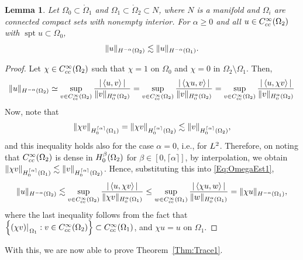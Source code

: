 \documentclass[a4paper,10pt,reqno]{amsart}
\newcommand{\rest}[1]{{{\lvert_{}}_{}}_{#1}}
\newcommand{\dbrac}[1]{\left\{#1\right\}}
\newcommand{\interior}[1]{\mathring{#1}}
\newcommand{\modulus}[1]{|#1|}
\newcommand{\norm}[1]{\| #1 \|}%
\newcommand{\set}[1]{\dbrac{#1}}
\newcommand{\Lp}[2][{}]{{\rm L}^{#2}_{\rm #1}}%
\newcommand{\Ck}[2][{}]{{\rm C}^{#2}_{\rm #1}}%
\newcommand{\Hard}[2][{}]{{\rm H}^{#2}_{\rm #1}}%
\newcommand{\SobH}[2][{}]{\Hard[#1]{\rm #2}}
\newcommand{\ceil}[1]{\lceil #1 \rceil}%
\DeclareMathOperator{\spt}{spt}%
\newcommand{\inprod}[1]{\left\langle #1 \right\rangle}%
\newtheorem{lemma}[theorem]{Lemma}
\theoremstyle{definition}
\begin{document}
\begin{lemma}
\label{Lem:OmegaEst}
Let $\Omega_0 \subset \interior{\Omega}_1$ and  $\Omega_1 \subset \interior{\Omega}_2 \subset N$, where $N$ is a manifold and $\Omega_i$ are connected compact sets with nonempty interior.
For $\alpha \geq 0$ and all $u \in \Ck[cc]{\infty}(\Omega_2)$ with $\spt u \subset \Omega_0$,
$$ \norm{u}_{\SobH{-\alpha}(\Omega_2)} \lesssim \norm{u}_{\SobH{-\alpha}(\Omega_1)}.$$
\end{lemma}
\begin{proof}
Let $\chi \in \Ck[cc]{\infty}(\Omega_2)$ such that $\chi = 1$ on $\Omega_0$ and $\chi = 0$ in $\Omega_2 \setminus \Omega_1$.
Then,
\begin{align}
\label{Eq:OmegaEst1}
\norm{u}_{\SobH{-\alpha}(\Omega_2)}
\simeq
\sup_{v \in \Ck[cc]{\infty}(\Omega_2)} \frac{\modulus{\inprod{u, v}}}{\norm{v}_{\SobH[0]{\alpha}(\Omega_2)}}
=
\sup_{v \in \Ck[cc]{\infty}(\Omega_2)} \frac{\modulus{\inprod{\chi u, v}}}{\norm{v}_{\SobH[0]{\alpha}(\Omega_2)}}
=
\sup_{v \in \Ck[cc]{\infty}(\Omega_2)} \frac{\modulus{\inprod{ u, \chi v}}}{\norm{v}_{\SobH[0]{\alpha}(\Omega_2)}}
\end{align}
Now, note that
$$ \norm{\chi v}_{\SobH[0]{\ceil{\alpha}}(\Omega_1)}
=
\norm{\chi v}_{\SobH[0]{\ceil{\alpha}}(\Omega_2)}
\lesssim
\norm{v}_{\SobH[0]{\ceil{\alpha}}(\Omega_2)},
$$
and this inequality holds also for the case $\alpha = 0$, i.e., for $\Lp{2}$.
Therefore, on noting that $\Ck[cc]{\infty}(\Omega_2)$ is dense in $\SobH[0]{\beta}(\Omega_2)$ for $\beta \in [0,\ceil{\alpha}]$, by interpolation, we obtain $\norm{\chi v}_{\SobH[0]{\ceil{\alpha}}(\Omega_1)} \lesssim \norm{v}_{\SobH[0]{\ceil{\alpha}}(\Omega_2)}$.
Hence, substituting this into \eqref{Eq:OmegaEst1},
$$
\norm{u}_{\SobH{-\alpha}(\Omega_2)}
\lesssim
\sup_{v \in \Ck[cc]{\infty}(\Omega_2)} \frac{\modulus{\inprod{ u, \chi v}}}{\norm{\chi v}_{\SobH[0]{\alpha}(\Omega_1)}}
\leq
\sup_{w \in \Ck[cc]{\infty}(\Omega_1)} \frac{\modulus{\inprod{ \chi u, w}}}{\norm{w}_{\SobH[0]{\alpha}(\Omega_1)}}
= \norm{\chi u}_{\SobH{-\alpha}(\Omega_1)},$$
where the last inequality follows from the fact that $\set{ (\chi v)\rest{\Omega_1}: v \in \Ck[cc]{\infty}(\Omega_2)} \subset \Ck[cc]{\infty}(\Omega_1)$, and $\chi u = u$ on $\Omega_1$.
\end{proof}


With this, we are now able to prove Theorem~\ref{Thm:Trace1}.
\end{document}
